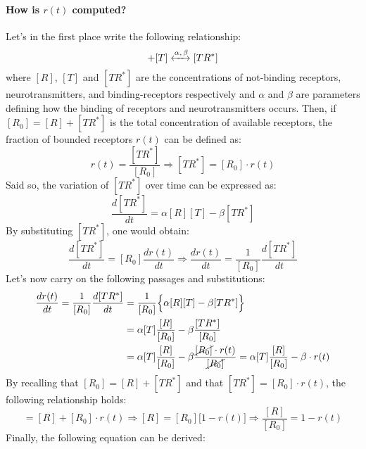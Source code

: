 \paragraph{How is \(r(t)\) computed?} Let's in the first place write the
following relationship:
\begin{equation*}
    [R]+[T]\xleftrightarrow{\alpha,\,\beta}[TR^{*}]
\end{equation*}
where \([R]\), \([T]\) and \([TR^{*}]\) are the concentrations of
not-binding receptors, neurotransmitters, and binding-receptors respectively
and \(\alpha\) and \(\beta\) are parameters defining how the binding of receptors
and neurotransmitters occurs.
Then, if \([R_{0}]=[R]+[TR^{*}]\) is the total concentration of available receptors, the
fraction of bounded receptors \(r(t)\) can be defined as:
\begin{equation*}
    r(t)=\frac{[TR^{*}]}{[R_{0}]}
    \Rightarrow
    [TR^{*}]=[R_{0}]\cdot{r(t)}
\end{equation*}
Said so, the variation of \([TR^{*}]\) over time can be expressed as:
\begin{equation*}
    \frac{d[TR^{*}]}{dt}=\alpha{[R][T]}-\beta{[TR^{*}]}
\end{equation*}
By substituting \([TR^{*}]\), one would obtain:
\begin{equation*}
    \frac{d[TR^{*}]}{dt}=[R_{0}]\frac{dr(t)}{dt}
    \Rightarrow
    \frac{dr(t)}{dt}=\frac{1}{[R_{0}]}\frac{d[TR^{*}]}{dt}
\end{equation*}
Let's now carry on the following passages and substitutions:
\begin{align*}
    \frac{dr(t)}{dt}
    =\frac{1}{[R_{0}]}\frac{d[TR^{*}]}{dt}
     & =\frac{1}{[R_{0}]}\Bigl\{\alpha[R][T]-\beta[TR^{*}]\Bigr\}                              \\
     & =\alpha[T]\frac{[R]}{[R_{0}]}-\beta\frac{[TR^{*}]}{[R_{0}]}                             \\
     & =\alpha[T]\frac{[R]}{[R_{0}]}-\beta\frac{\cancel{[R_{0}]}\cdot{r(t)}}{\cancel{[R_{0}]}}
    =\alpha[T]\frac{[R]}{[R_{0}]}-\beta\cdot{r(t)}
\end{align*}
By recalling that \([R_{0}]=[R]+[TR^{*}]\) and that \([TR^{*}]=[R_{0}]\cdot{r(t)}\), the
following relationship holds:
\begin{equation*}
    [R_{0}]=[R]+[R_{0}]\cdot{r(t)}
    \Rightarrow
    [R]=[R_{0}]\bigl[1-r(t)\bigr]
    \Rightarrow
    \frac{[R]}{[R_{0}]}=1-r(t)
\end{equation*}
Finally, the following equation can be derived:
